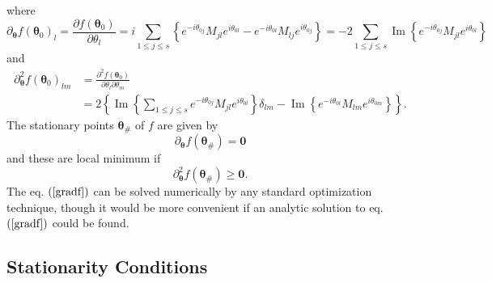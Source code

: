 \documentclass[aps,preprint]{revtex4}%
\begin{document}
where
\begin{equation}
\partial_{\mathbf{\theta}}f\left(  \mathbf{\theta}_{0}\right)  _{l}%
=\frac{\partial f\left(  \mathbf{\theta}_{0}\right)  }{\partial\theta_{l}%
}=i\sum_{1\leq j\leq s}\left\{  e^{-i\theta_{0j}}M_{jl}e^{i\theta_{0l}%
}-e^{-i\theta_{0l}}M_{lj}e^{i\theta_{0j}}\right\}  =-2\sum_{1\leq j\leq
s}\operatorname{Im}\left\{  e^{-i\theta_{0j}}M_{jl}e^{i\theta_{0l}}\right\}
\end{equation}
and
\begin{align}
\partial_{\mathbf{\theta}}^{2}f\left(  \mathbf{\theta}_{0}\right)  _{lm}  &
=\frac{\partial^{2}f\left(  \mathbf{\theta}_{0}\right)  }{\partial\theta
_{l}\partial\theta_{m}}\nonumber\\
&  =2\left\{  \operatorname{Im}\left\{  \sum_{1\leq j\leq s}e^{-i\theta_{0j}%
}M_{jl}e^{i\theta_{0l}}\right\}  \delta_{lm}-\operatorname{Im}\left\{
e^{-i\theta_{0l}}M_{lm}e^{i\theta_{0m}}\right\}  \right\}  .
\end{align}
The stationary points $\mathbf{\theta}_{\#}$ of $f$ are given by
\begin{equation}
\partial_{\mathbf{\theta}}f\left(  \mathbf{\theta}_{\#}\right)  =\mathbf{0}
\label{gradf}%
\end{equation}
and these are local minimum if
\begin{equation}
\partial_{\mathbf{\theta}}^{2}f\left(  \mathbf{\theta}_{\#}\right)
\geq\mathbf{0.}%
\end{equation}
The eq. $\left(  \ref{gradf}\right)  $ can be solved numerically by any
standard optimization technique, though it would be more convenient if an
analytic solution to eq. $\left(  \ref{gradf}\right)  $ could be found.

\subsection{Stationarity Conditions}
\end{document}
